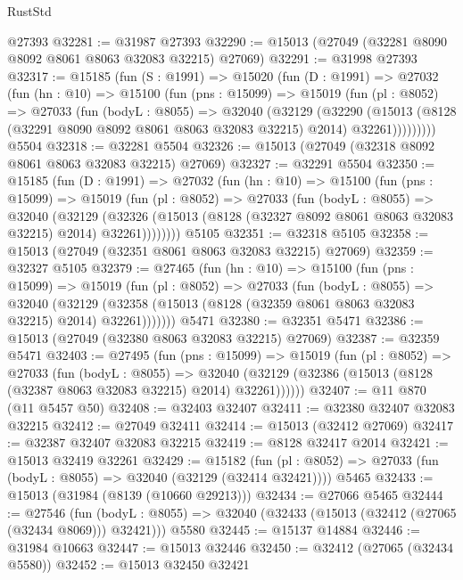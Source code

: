 \begin{lexlean}{RustStd}
\begin{coremodule}
    @27393
@32281 := @31987 @27393
@32290 := @15013 (@27049 (@32281 @8090 @8092 @8061 @8063 @32083 @32215) @27069)
@32291 := @31998 @27393
@32317 := @15185
    (fun (S : @1991) =>
    @15020
      (fun (D : @1991) =>
      @27032
        (fun (hn : @10) =>
        @15100
          (fun (pns : @15099) =>
          @15019
            (fun (pl : @8052) =>
            @27033
              (fun (bodyL : @8055) =>
              @32040
                (@32129
                  (@32290
                    (@15013
                      (@8128 (@32291 @8090 @8092 @8061 @8063 @32083 @32215) @2014)
                      @32261)))))))))
    @5504
@32318 := @32281 @5504
@32326 := @15013 (@27049 (@32318 @8092 @8061 @8063 @32083 @32215) @27069)
@32327 := @32291 @5504
@32350 := @15185
    (fun (D : @1991) =>
    @27032
      (fun (hn : @10) =>
      @15100
        (fun (pns : @15099) =>
        @15019
          (fun (pl : @8052) =>
          @27033
            (fun (bodyL : @8055) =>
            @32040
              (@32129
                (@32326
                  (@15013 (@8128 (@32327 @8092 @8061 @8063 @32083 @32215) @2014) @32261))))))))
    @5105
@32351 := @32318 @5105
@32358 := @15013 (@27049 (@32351 @8061 @8063 @32083 @32215) @27069)
@32359 := @32327 @5105
@32379 := @27465
    (fun (hn : @10) =>
    @15100
      (fun (pns : @15099) =>
      @15019
        (fun (pl : @8052) =>
        @27033
          (fun (bodyL : @8055) =>
          @32040
            (@32129 (@32358 (@15013 (@8128 (@32359 @8061 @8063 @32083 @32215) @2014) @32261)))))))
    @5471
@32380 := @32351 @5471
@32386 := @15013 (@27049 (@32380 @8063 @32083 @32215) @27069)
@32387 := @32359 @5471
@32403 := @27495
    (fun (pns : @15099) =>
    @15019
      (fun (pl : @8052) =>
      @27033
        (fun (bodyL : @8055) =>
        @32040 (@32129 (@32386 (@15013 (@8128 (@32387 @8063 @32083 @32215) @2014) @32261))))))
@32407 := @11 @870 (@11 @5457 @50)
@32408 := @32403 @32407
@32411 := @32380 @32407 @32083 @32215
@32412 := @27049 @32411
@32414 := @15013 (@32412 @27069)
@32417 := @32387 @32407 @32083 @32215
@32419 := @8128 @32417 @2014
@32421 := @15013 @32419 @32261
@32429 := @15182
    (fun (pl : @8052) => @27033 (fun (bodyL : @8055) => @32040 (@32129 (@32414 @32421))))
    @5465
@32433 := @15013 (@31984 (@8139 (@10660 @29213)))
@32434 := @27066 @5465
@32444 := @27546
    (fun (bodyL : @8055) => @32040 (@32433 (@15013 (@32412 (@27065 (@32434 @8069))) @32421)))
    @5580
@32445 := @15137 @14884
@32446 := @31984 @10663
@32447 := @15013 @32446
@32450 := @32412 (@27065 (@32434 @5580))
@32452 := @15013 @32450 @32421

\end{coremodule}
\end{lexlean}
